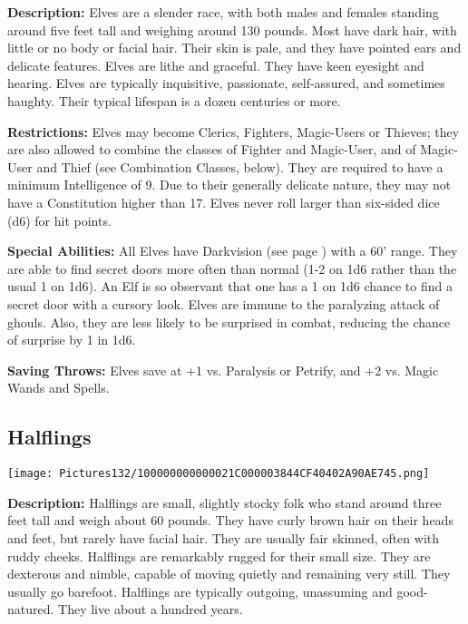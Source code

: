 \documentclass[a4paper,twoside,openany,10pt]{book}
\begin{document}
\begin{multicols}{2}
\textbf{Description:}
Elves are a slender race, with both males and females standing around five feet tall and weighing around 130 pounds. Most have dark hair, with little or no body or facial hair. Their skin is pale, and they have pointed ears and delicate features. Elves are lithe and graceful. They have keen eyesight and hearing. Elves are typically inquisitive, passionate, self-assured, and sometimes haughty. Their typical lifespan is a dozen centuries or more.

\textbf{Restrictions: } Elves may become Clerics, Fighters, Magic-Users or Thieves; they are also allowed to combine the classes of Fighter and Magic-User, and of Magic-User and Thief (see Combination Classes, below). They are required to have a minimum Intelligence of 9. Due to their generally delicate nature, they may not have a Constitution higher than 17. Elves never roll larger than six-sided dice (d6) for hit points.

\textbf{Special Abilities: }All Elves have Darkvision (see page \hyperlink{darkvision}{\pageref{darkvision}}) with a 60'{} range. They are able to find secret doors more often than normal (1-2 on 1d6 rather than the usual 1 on 1d6). An Elf is so observant that one has a 1 on 1d6 chance to find a secret door with a cursory look. Elves are immune to the paralyzing attack of ghouls. Also, they are less likely to be surprised in combat, reducing the chance of surprise by 1 in 1d6.

\textbf{Saving Throws: } Elves save at +1 vs. Paralysis or Petrify, and
+2 vs. Magic Wands and Spells.

\subsection{Halflings}\label{halflings}

\begin{center}
	\texttt{[image: Pictures132/100000000000021C000003844CF40402A90AE745.png]}
\end{center}\medskip

\textbf{Description:}
Halflings are small, slightly stocky folk who stand around three feet tall and weigh about 60 pounds. They have curly brown hair on their heads and feet, but rarely have facial hair. They are usually fair skinned, often with ruddy cheeks. Halflings are remarkably rugged for their small size. They are dexterous and nimble, capable of moving quietly and remaining very still. They usually go barefoot. Halflings are typically outgoing, unassuming and good-natured. They live about a hundred years.


\end{multicols}
\end{document}
